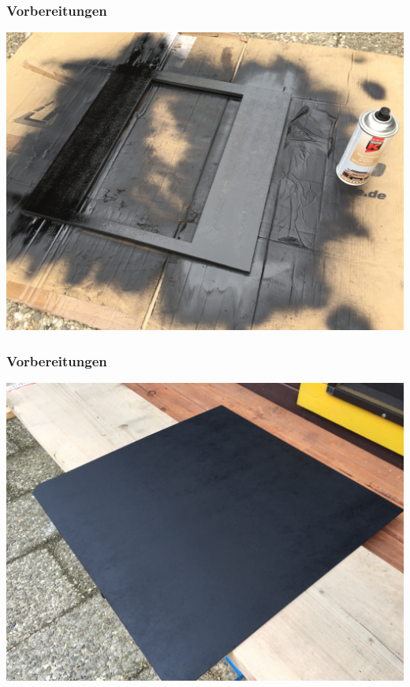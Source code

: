 \documentclass[11pt]{beamer}
\begin{document}
	\begin{frame}
		\frametitle{Vorbereitungen}
		\begin{center}
			\includegraphics[scale=0.07]{images/20170603173636215iOS.jpg}
		\end{center}
	\end{frame}
	
	\begin{frame}
		\frametitle{Vorbereitungen}
		\begin{center}
			\includegraphics[scale=0.07]{images/20170603173640217iOS.jpg}
		\end{center}
	\end{frame}	
		
\end{document}
